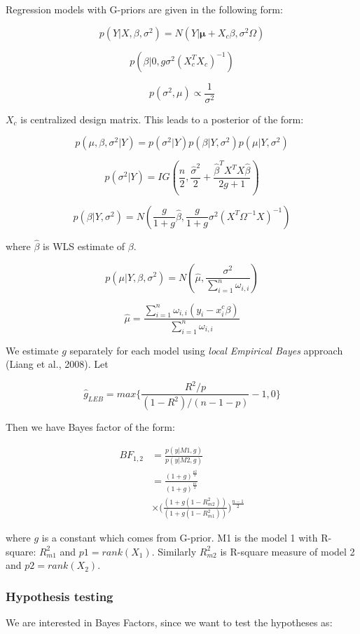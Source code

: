 \documentclass[11pt,twocolumn]{asaproc}
\begin{document}
Regression models with G-priors are given in the following form:

$$p(Y | X, \beta, \sigma^2) = N(Y | \pmb{\mu} + X_c\beta, \sigma^2\Omega)$$

$$p(\beta | 0, g\sigma^2 (X_c^TX_c)^{-1})$$

$$p(\sigma^2, \mu) \propto \frac{1}{\sigma^2}$$

$X_c$ is centralized design matrix. This leads to a posterior of the form: 

$$p(\mu, \beta, \sigma^2 | Y) = p(\sigma^2 | Y)p(\beta|Y, \sigma^2)p(\mu|Y, \sigma^2)$$

$$p(\sigma^2 | Y) = IG(\frac{n}{2}, \frac{\hat{\sigma}^2}{2} + \frac{\hat{\beta}^T X^T X \hat{\beta}}{2g+1})$$

$$p(\beta|Y, \sigma^2) = N(\frac{g}{1+g}\hat{\beta}, \frac{g}{1+g}\sigma^2(X^T\Omega^{-1}X)^{-1})$$

where $\hat{\beta}$ is WLS estimate of $\beta$. 

$$p(\mu|Y, \beta, \sigma^2) = N(\hat{\mu}, \frac{\sigma^2}{\sum_{i=1}^n\omega_{i,i}})$$

$$\hat{\mu} = \frac{\sum_{i=1}^n\omega_{i,i}(y_i - x^c_i\beta)}{\sum_{i=1}^n\omega_{i,i}}$$


We estimate $g$ separately for each model using \textit{local Empirical Bayes} approach (Liang et al., 2008). Let 

$$\hat{g}_{LEB} = max\{\frac{R^2/p}{(1-R^2) / (n-1-p)} - 1, 0\}$$


Then we have Bayes factor of the form: 

\begin{align*}
BF_{1,2} & = \frac{p(y | M1, g)}{p(y | M2, g)} \\
&= \frac{(1+g)^{\frac{p2}{2}}}{(1+g)^{\frac{p1}{2}}}\\
&\times \Big(\frac{(1+g(1-R^2_{m2}))}{(1+g(1-R^2_{m1}))}\Big)^{\frac{n-1}{2}}
\end{align*}

where $g$ is a constant which comes from G-prior. M1 is the model 1 with R-square: $R^2_{m1}$ and $p1 = rank(X_1)$. Similarly $R^2_{m2}$ is R-square measure of model 2 and $p2 = rank(X_2)$. 



\subsubsection{Hypothesis testing}
We are interested in Bayes Factors, since we want to test the hypotheses as: 
\end{document}
